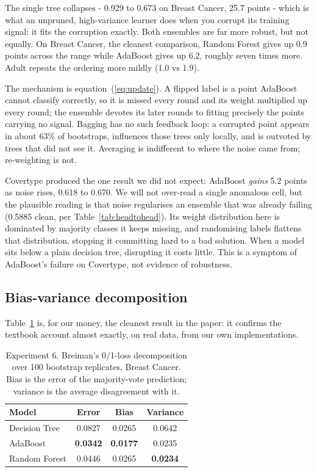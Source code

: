 \documentclass[conference]{IEEEtran}
\begin{document}
The single tree collapses - 0.929 to 0.673 on Breast Cancer, 25.7 points
- which is what an unpruned, high-variance learner does when you corrupt
its training signal: it fits the corruption exactly.  Both ensembles are
far more robust, but not equally.  On Breast Cancer, the cleanest
comparison, Random Forest gives up 0.9 points across the range while
AdaBoost gives up 6.2, roughly seven times more.  Adult repeats the
ordering more mildly (1.0 vs 1.9).

The mechanism is equation~(\ref{eq:update}).  A flipped label is a point
AdaBoost cannot classify correctly, so it is missed every round and its
weight multiplied up every round; the ensemble devotes its later rounds to
fitting precisely the points carrying no signal.  Bagging has no such
feedback loop: a corrupted point appears in about 63\% of bootstraps,
influences those trees only locally, and is outvoted by trees that did not
see it.  Averaging is indifferent to where the noise came from;
re-weighting is not.

Covertype produced the one result we did not expect: AdaBoost \emph{gains}
5.2 points as noise rises, 0.618 to 0.670.  We will not over-read a single
anomalous cell, but the plausible reading is that noise regularises an
ensemble that was already failing (0.5885 clean, per
Table~\ref{tab:headtohead}).  Its weight distribution here is dominated by
majority classes it keeps missing, and randomising labels flattens that
distribution, stopping it committing hard to a bad solution.  When a model
sits below a plain decision tree, disrupting it costs little.  This is a
symptom of AdaBoost's failure on Covertype, not evidence of robustness.

\subsection{Bias-variance decomposition}
Table~\ref{tab:biasvar} is, for our money, the cleanest result in the
paper: it confirms the textbook account almost exactly, on real data, from
our own implementations.

\begin{table}[t]
\centering
\caption{Experiment 6.  Breiman's 0/1-loss decomposition over 100 bootstrap
replicates, Breast Cancer.  Bias is the error of the majority-vote
prediction; variance is the average disagreement with it.}
\label{tab:biasvar}
\begin{tabular}{lccc}
\toprule
\textbf{Model} & \textbf{Error} & \textbf{Bias} & \textbf{Variance}\\
\midrule
Decision Tree & 0.0827 & 0.0265 & 0.0642\\
AdaBoost      & \textbf{0.0342} & \textbf{0.0177} & 0.0235\\
Random Forest & 0.0446 & 0.0265 & \textbf{0.0234}\\
\bottomrule
\end{tabular}
\end{table}
\end{document}
